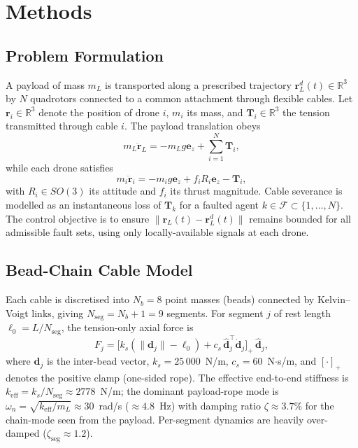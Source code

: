 
\section{Methods}
\label{sec:methods}

\subsection{Problem Formulation}
A payload of mass $m_L$ is transported along a prescribed trajectory $\mathbf{r}_L^d(t)\in\mathbb{R}^3$ by $N$ quadrotors connected to a common attachment through flexible cables. Let $\mathbf{r}_i\in\mathbb{R}^3$ denote the position of drone $i$, $m_i$ its mass, and $\mathbf{T}_i\in\mathbb{R}^3$ the tension transmitted through cable $i$. The payload translation obeys
\begin{equation}
m_L \ddot{\mathbf{r}}_L = -m_L g\mathbf{e}_z + \sum_{i=1}^{N}\mathbf{T}_i,
\end{equation}
while each drone satisfies
\begin{equation}
m_i \ddot{\mathbf{r}}_i = -m_i g\mathbf{e}_z + f_i R_i\mathbf{e}_z - \mathbf{T}_i,
\end{equation}
with $R_i\in SO(3)$ its attitude and $f_i$ its thrust magnitude. Cable severance is modelled as an instantaneous loss of $\mathbf{T}_k$ for a faulted agent $k\in\mathcal{F}\subset\{1,\dots,N\}$. The control objective is to ensure $\|\mathbf{r}_L(t)-\mathbf{r}_L^d(t)\|$ remains bounded for all admissible fault sets, using only locally-available signals at each drone.

\subsection{Bead-Chain Cable Model}
Each cable is discretised into $N_b=8$ point masses (beads) connected by Kelvin--Voigt links, giving $N_{\mathrm{seg}}=N_b+1=9$ segments. For segment $j$ of rest length $\ell_0=L/N_{\mathrm{seg}}$, the tension-only axial force is
\begin{equation}
F_j = \big[k_s(\|\mathbf{d}_j\|-\ell_0) + c_s\,\hat{\mathbf{d}}_j^\top\dot{\mathbf{d}}_j\big]_+\,\hat{\mathbf{d}}_j,
\end{equation}
where $\mathbf{d}_j$ is the inter-bead vector, $k_s=25\,000$~N/m, $c_s=60$~N$\cdot$s/m, and $[\cdot]_+$ denotes the positive clamp (one-sided rope). The effective end-to-end stiffness is $k_{\mathrm{eff}}=k_s/N_{\mathrm{seg}}\approx 2778$~N/m; the dominant payload-rope mode is
$\omega_n=\sqrt{k_{\mathrm{eff}}/m_L}\approx 30$~rad/s ($\approx 4.8$~Hz) with damping ratio $\zeta\approx 3.7\%$ for the chain-mode seen from the payload. Per-segment dynamics are heavily over-damped ($\zeta_{\mathrm{seg}}\approx 1.2$).

